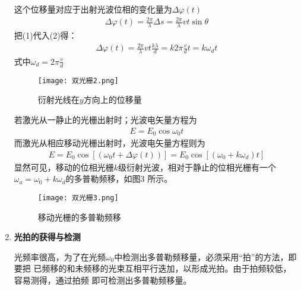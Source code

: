 \documentclass[dvipsnames, svgnames,a4paper,11pt]{article}
\begin{document}
\begin{enumerate}
    这个位移量对应于出射光波位相的变化量为$\Delta \varphi(t)$
    \begin{align}
        \Delta \varphi(t)=\frac{2\pi}{\lambda}\Delta s=\frac{2\pi}{\lambda}vt\sin\theta
    \end{align}
    把(1)代入(2)得：
    \begin{align}
        \Delta \varphi(t)=\frac{2\pi}{\lambda}vt\frac{k\lambda}{d}=k2\pi\frac{v}{d}t=k\omega_d t
    \end{align}
    式中$\omega_d=2\pi\frac{v}{d}$
    \begin{figure}[H]
        \centering
        \texttt{[image: 双光栅2.png]}
        \caption{衍射光线在$y$方向上的位移量}
    \end{figure}
    若激光从一静止的光栅出射时；光波电矢量方程为
    \begin{align*}
        E=E_0\cos\omega_0t
    \end{align*}
    而激光从相应移动光栅出射时，光波电矢量方程则为
    \begin{align}
        E=E_0\cos[(\omega_0t+\Delta \varphi(t))]=E_0\cos[(\omega_0+k\omega_d)t]
    \end{align}
    显然可见，移动的位相光栅$k $级衍射光波，相对于静止的位相光栅有一个$\omega_a=\omega_0+k\omega_d$的多普勒频移，如图3 所示。
    \begin{figure}[H]
        \centering
        \texttt{[image: 双光栅3.png]}
        \caption{移动光栅的多普勒频移}
    \end{figure}
    \item \textbf{光拍的获得与检测}\par
    光频率很高，为了在光频$\omega_0$中检测出多普勒频移量，必须采用“拍”的方法，即要把
    已频移的和未频移的光束互相平行迭加，以形成光拍。由于拍频较低，容易测得，通过拍频
    即可检测出多普勒频移量。


\end{enumerate}
\end{document}
